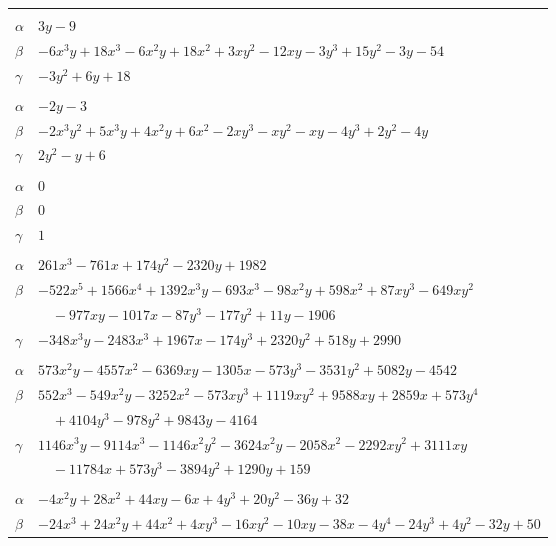 \documentclass[11pt]{article}
\begin{document}
\begin{longtable}{@{}ll@{}}
\addlinespace[3pt]
\multicolumn{2}{@{}l}{$\{i,j\}=\{26,40\}$, $k_{ij}=3^{2}\cdot 13$}\\
$\alpha$ & $3y-9$\\
$\beta$ & $-6x^{3}y+18x^{3}-6x^{2}y+18x^{2}+3xy^{2}-12xy-3y^{3}+15y^{2}-3y-54$\\
$\gamma$ & $-3y^{2}+6y+18$\\
\addlinespace[3pt]
\multicolumn{2}{@{}l}{$\{i,j\}=\{26,43\}$, $k_{ij}=3$}\\
$\alpha$ & $-2y-3$\\
$\beta$ & $-2x^{3}y^{2}+5x^{3}y+4x^{2}y+6x^{2}-2xy^{3}-xy^{2}-xy-4y^{3}+2y^{2}-4y$\\
$\gamma$ & $2y^{2}-y+6$\\
\addlinespace[3pt]
\multicolumn{2}{@{}l}{$\{i,j\}=\{30,97\}$, $k_{ij}=7$}\\
$\alpha$ & $0$\\
$\beta$ & $0$\\
$\gamma$ & $1$\\
\addlinespace[3pt]
\multicolumn{2}{@{}l}{$\{i,j\}=\{31,32\}$, $k_{ij}=2^{4}\cdot 3^{2}\cdot 7$}\\
$\alpha$ & $261x^{3}-761x+174y^{2}-2320y+1982$\\
$\beta$ & $-522x^{5}+1566x^{4}+1392x^{3}y-693x^{3}-98x^{2}y+598x^{2}+87xy^{3}-649xy^{2}$\\
 & $\quad -977xy-1017x-87y^{3}-177y^{2}+11y-1906$\\
$\gamma$ & $-348x^{3}y-2483x^{3}+1967x-174y^{3}+2320y^{2}+518y+2990$\\
\addlinespace[3pt]
\multicolumn{2}{@{}l}{$\{i,j\}=\{32,41\}$, $k_{ij}=2\cdot 3^{3}\cdot 7$}\\
$\alpha$ & $573x^{2}y-4557x^{2}-6369xy-1305x-573y^{3}-3531y^{2}+5082y-4542$\\
$\beta$ & $552x^{3}-549x^{2}y-3252x^{2}-573xy^{3}+1119xy^{2}+9588xy+2859x+573y^{4}$\\
 & $\quad +4104y^{3}-978y^{2}+9843y-4164$\\
$\gamma$ & $1146x^{3}y-9114x^{3}-1146x^{2}y^{2}-3624x^{2}y-2058x^{2}-2292xy^{2}+3111xy$\\
 & $\quad -11784x+573y^{3}-3894y^{2}+1290y+159$\\
\addlinespace[3pt]
\multicolumn{2}{@{}l}{$\{i,j\}=\{32,48\}$, $k_{ij}=2\cdot 3^{2}$}\\
$\alpha$ & $-4x^{2}y+28x^{2}+44xy-6x+4y^{3}+20y^{2}-36y+32$\\
$\beta$ & $-24x^{3}+24x^{2}y+44x^{2}+4xy^{3}-16xy^{2}-10xy-38x-4y^{4}-24y^{3}+4y^{2}-32y+50$\\

\end{longtable}
\end{document}
